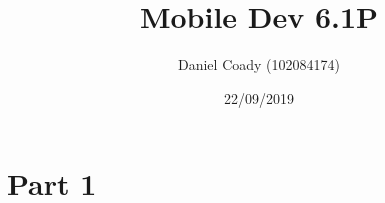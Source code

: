 \documentclass{scrartcl}
\title{Mobile Dev 6.1P}
\author{Daniel Coady (102084174)}
\date{22/09/2019}
\begin{document}
\maketitle

\section*{Part 1}
\end{document}
